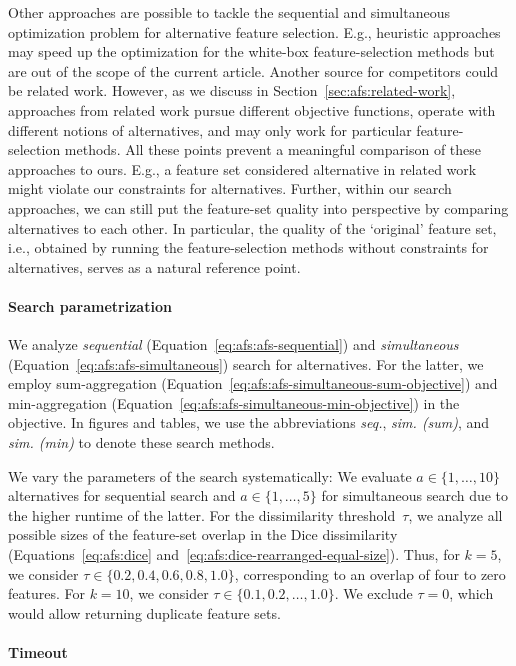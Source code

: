 \documentclass[iicol, sn-basic, Numbered]{sn-jnl} %
\theoremstyle{plain}
\theoremstyle{definition}
\begin{document}
Other approaches are possible to tackle the sequential and simultaneous optimization problem for alternative feature selection.
E.g., heuristic approaches may speed up the optimization for the white-box feature-selection methods but are out of the scope of the current article.
Another source for competitors could be related work.
However, as we discuss in Section~\ref{sec:afs:related-work}, approaches from related work pursue different objective functions, operate with different notions of alternatives, and may only work for particular feature-selection methods.
All these points prevent a meaningful comparison of these approaches to ours.
E.g., a feature set considered alternative in related work might violate our constraints for alternatives.
Further, within our search approaches, we can still put the feature-set quality into perspective by comparing alternatives to each other.
In particular, the quality of the `original' feature set, i.e., obtained by running the feature-selection methods without constraints for alternatives, serves as a natural reference point.

\paragraph{Search parametrization}

We analyze \emph{sequential} (Equation~\ref{eq:afs:afs-sequential}) and \emph{simultaneous} (Equation~\ref{eq:afs:afs-simultaneous}) search for alternatives.
For the latter, we employ sum-aggregation (Equation~\ref{eq:afs:afs-simultaneous-sum-objective}) and min-aggregation (Equation~\ref{eq:afs:afs-simultaneous-min-objective}) in the objective.
In figures and tables, we use the abbreviations \emph{seq.}, \emph{sim. (sum)}, and \emph{sim. (min)} to denote these search methods.

We vary the parameters of the search systematically:
We evaluate $a \in \{1, \dots, 10\}$ alternatives for sequential search and $a \in \{1, \dots, 5\}$ for simultaneous search due to the higher runtime of the latter.
For the dissimilarity threshold~$\tau$, we analyze all possible sizes of the feature-set overlap in the Dice dissimilarity (Equations~\ref{eq:afs:dice} and~\ref{eq:afs:dice-rearranged-equal-size}).
Thus, for $k=5$, we consider $\tau \in \{0.2, 0.4, 0.6, 0.8, 1.0\}$, corresponding to an overlap of four to zero features.
For $k=10$, we consider $\tau \in \{0.1, 0.2, \dots, 1.0\}$.
We exclude $\tau = 0$, which would allow returning duplicate feature sets.

\paragraph{Timeout}
\end{document}
